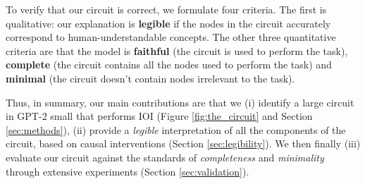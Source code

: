 To verify that our circuit is correct, we formulate four criteria. The first is qualitative: our explanation is \textbf{legible} if the nodes in the circuit accurately correspond to human-understandable concepts. The other three quantitative criteria are that the model is \textbf{faithful} (the circuit is used to perform the task), \textbf{complete}  (the circuit contains all the nodes used to perform the task) and \textbf{minimal} (the circuit doesn't contain nodes irrelevant to the task).

Thus, in summary, our main contributions are that we (i) identify a large circuit in GPT-2 small that performs IOI (Figure \ref{fig:the_circuit} and Section \ref{sec:methods}), (ii) provide a \textit{legible} interpretation of all the components of the circuit, based on causal interventions (Section \ref{sec:legibility}). We then finally (iii) evaluate our circuit against the standards of \textit{completeness} and \textit{minimality} through extensive experiments (Section \ref{sec:validation}).



